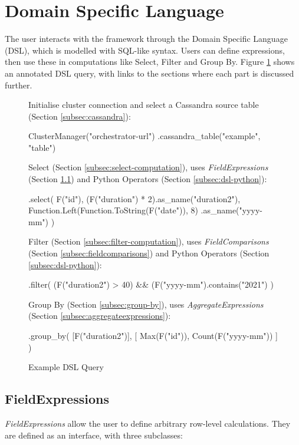 \section{Domain Specific Language}
The user interacts with the framework through the Domain Specific Language (DSL), which is modelled with SQL-like syntax. Users can define expressions, then use these in computations like Select, Filter and Group By. Figure \ref{fig:dsl-high-level-example} shows an annotated DSL query, with links to the sections where each part is discussed further.

\begin{figure}[htp]
	Initialise cluster connection and select a Cassandra source table (Section \ref{subsec:cassandra}):
	\begin{python}
ClusterManager("orchestrator-url")
  .cassandra_table("example", "table")
	\end{python}
	
	Select (Section \ref{subsec:select-computation}), uses \textit{FieldExpressions} (Section \ref{subsec:fieldexpressions}) and Python Operators (Section \ref{subsec:dsl-python}):
	\begin{python}
  .select(
    F("id"),
    (F("duration") * 2).as_name("duration2"),
    Function.Left(Function.ToString(F("date")), 8)
      .as_name("yyyy-mm")
  )
	\end{python}

	Filter (Section \ref{subsec:filter-computation}), uses \textit{FieldComparisons} (Section \ref{subsec:fieldcomparisons}) and Python Operators (Section \ref{subsec:dsl-python}):
	\begin{python}
  .filter(
    (F("duration2") > 40) && 
  	(F("yyyy-mm").contains("2021")
  )
	\end{python}

	Group By (Section \ref{subsec:group-by}), uses \textit{AggregateExpressions} (Section \ref{subsec:aggregateexpressions}):
	\begin{python}
  .group_by(
    [F("duration2")],
    [
      Max(F("id")),
      Count(F("yyyy-mm"))
    ]
  )
	\end{python}
	\caption{Example DSL Query}
	\label{fig:dsl-high-level-example}
\end{figure}

\subsection{FieldExpressions}\label{subsec:fieldexpressions}
\textit{FieldExpressions} allow the user to define arbitrary row-level calculations. They are defined as an interface, with three subclasses:

